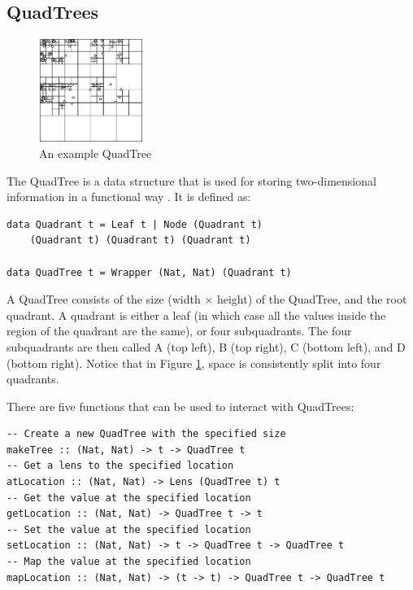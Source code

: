 \subsection{QuadTrees}
\begin{figure} %
	\vspace{-40pt}
	\includegraphics[width=0.3\textwidth]{graphics/test.png}
	\caption{An example QuadTree}
	\label{quadtree_img}
	\vspace{-90pt}
\end{figure}

The QuadTree is a data structure that is used for storing two-dimensional information in a functional way \cite{Finkel1974}. It is defined as:
\begin{verbatim}
data Quadrant t = Leaf t | Node (Quadrant t) 
	(Quadrant t) (Quadrant t) (Quadrant t)

data QuadTree t = Wrapper (Nat, Nat) (Quadrant t)
\end{verbatim}

A QuadTree consists of the size (width  ×  height) of the QuadTree, and the root quadrant. A quadrant is either a leaf (in which case all the values inside the region of the quadrant are the same), or four subquadrants. The four subquadrants are then called A (top left), B (top right), C (bottom left), and D (bottom right). Notice that in Figure \ref{quadtree_img}, space is consistently split into four quadrants.

There are five functions that can be used to interact with QuadTrees:
\begin{verbatim}
-- Create a new QuadTree with the specified size
makeTree :: (Nat, Nat) -> t -> QuadTree t
-- Get a lens to the specified location
atLocation :: (Nat, Nat) -> Lens (QuadTree t) t
-- Get the value at the specified location
getLocation :: (Nat, Nat) -> QuadTree t -> t
-- Set the value at the specified location
setLocation :: (Nat, Nat) -> t -> QuadTree t -> QuadTree t
-- Map the value at the specified location
mapLocation :: (Nat, Nat) -> (t -> t) -> QuadTree t -> QuadTree t
\end{verbatim}
